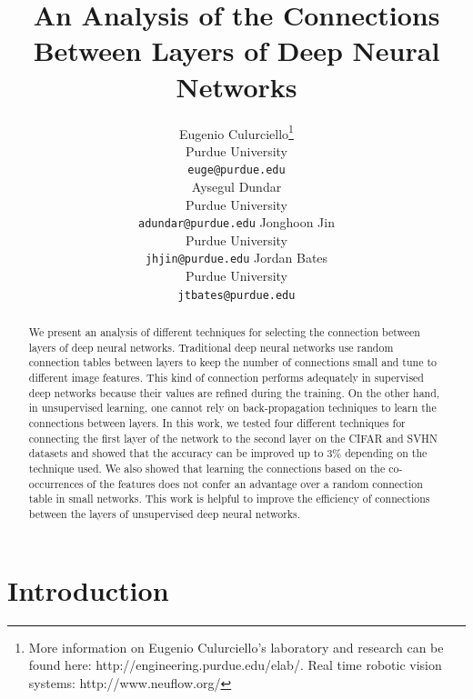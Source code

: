 \documentclass{article} %
\begin{document}
\title{An Analysis of the Connections  \\ Between Layers of Deep Neural Networks}

\author{
Eugenio Culurciello\thanks{More information on Eugenio Culurciello's laboratory and research can be found here: http://engineering.purdue.edu/elab/. Real time robotic vision systems: http://www.neuflow.org/} \\
Purdue University\\
\texttt{euge@purdue.edu} \\
\And
Aysegul Dundar \\
Purdue University\\
\texttt{adundar@purdue.edu}
\AND
Jonghoon Jin \\
Purdue University\\
\texttt{jhjin@purdue.edu}
\And
Jordan Bates \\
Purdue University\\
\texttt{jtbates@purdue.edu}
}


\maketitle

\begin{abstract}
We present an analysis of different techniques for selecting the connection between layers of deep neural networks.
Traditional deep neural networks use random connection tables between layers to keep the number of connections small and tune to different image features.
This kind of connection performs adequately in supervised deep networks because their values are refined during the training.
On the other hand, in unsupervised learning, one cannot rely on back-propagation techniques to learn the connections between layers.
In this work, we tested four different techniques for connecting the first layer of the network to the second layer on the CIFAR and SVHN datasets and showed that the accuracy can be improved up to $3\%$ depending on the technique used.
We also showed that learning the connections based on the co-occurrences of the features does not confer an advantage over a random connection table in small networks.
This work is helpful to improve the efficiency of connections between the layers of unsupervised deep neural networks.
\end{abstract}


\section{Introduction}
\end{document}

